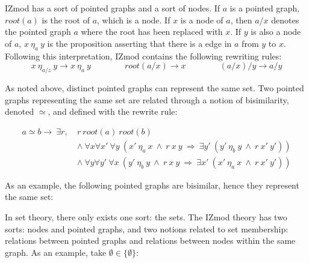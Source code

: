 \documentclass[submission,copyright,creativecommons]{eptcs}
\def\lra{\longrightarrow}
\def\imp{\mathbin{\Rightarrow}}
\def\fa{{\forall}}
\def\conj{\mathbin{\wedge}}
\def\ex{{\exists}}
\begin{document}
IZmod has a sort of pointed graphs and a sort of nodes. If $a$ is a pointed graph, $root(a)$ is the root of $a$, which is a node. If $x$ is a node of $a$, then $a/x$ denotes the pointed graph $a$ where the root has been replaced with $x$. If $y$ is also a node of $a$, $x~\eta_a~y$ is the proposition asserting that there is a edge in $a$ from $y$ to $x$. Following this interpretation, IZmod contains the following rewriting rules:
$$ x \ \eta_{a/z} \ y \longrightarrow x \ \eta_a \ y \qquad\qquad root(a/x) \longrightarrow x \qquad\qquad (a/x)/y \longrightarrow a/y $$

As noted above, distinct pointed graphs can represent the same set. Two pointed graphs representing the same set are related through a notion of bisimilarity, denoted $\simeq$, and defined with the rewrite rule:

\begin{equation*}
\begin{split}
a \simeq b \lra~\ex r,~ &r~root(a)~root(b) \\
&\conj \ \fa x \fa x'~\fa y~(x'~\eta_a~x~\conj~r~x~y~\imp~\ex y'~(y'~\eta_b~y~\conj~r~x'~y')) \\
&\conj \ \fa y \fa y'~\fa x~(y'~\eta_b~y~\conj~r~x~y~\imp~\ex x'~(x'~\eta_a~x~\conj~r~x'~y'))
\end{split}
\end{equation*}

As an example, the following pointed graphs are bisimilar, hence they represent the same set:

\begin{figure}[h]
\centering
{}
\end{figure}

In set theory, there only exists one sort: the sets. The IZmod theory has two sorts: nodes and pointed graphs, and two notions related to set membership: relations between pointed graphs and relations between nodes within the same graph. As an example, take $\emptyset \in \{\emptyset\}$:
\end{document}
